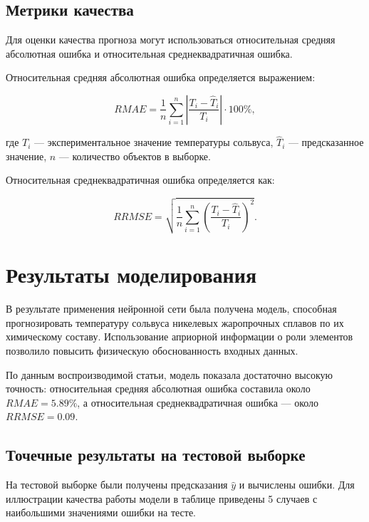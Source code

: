 \subsection{Метрики качества}

Для оценки качества прогноза могут использоваться относительная средняя 
абсолютная ошибка и относительная среднеквадратичная ошибка.

Относительная средняя абсолютная ошибка определяется выражением:

\begin{equation}
RMAE =
\frac{1}{n}
\sum_{i=1}^{n}
\left|
\frac{T_i - \hat{T}_i}{T_i}
\right| \cdot 100\%,
\end{equation}

где $T_i$ --- экспериментальное значение температуры сольвуса, $\hat{T}_i$ --- предсказанное значение, $n$ --- количество объектов в выборке.

Относительная среднеквадратичная ошибка определяется как:

\begin{equation}
RRMSE =
\sqrt{
\frac{1}{n}
\sum_{i=1}^{n}
\left(
\frac{T_i - \hat{T}_i}{T_i}
\right)^2
}.
\end{equation}

\section{Результаты моделирования}

В результате применения нейронной сети была получена модель, способная 
прогнозировать температуру сольвуса никелевых жаропрочных сплавов по 
их химическому составу. Использование априорной информации о роли элементов 
позволило повысить физическую обоснованность входных данных.

По данным воспроизводимой статьи, модель показала достаточно высокую 
точность: относительная средняя абсолютная ошибка составила около 
$RMAE = 5.89\%$, а относительная среднеквадратичная ошибка --- около $RRMSE = 0.09$.

\subsection{Точечные результаты на тестовой выборке}
На тестовой выборке были получены предсказания $\hat{y}$ и вычислены ошибки. 
Для иллюстрации качества работы модели в таблице приведены 5 случаев с 
наибольшими значениями ошибки на тесте.

